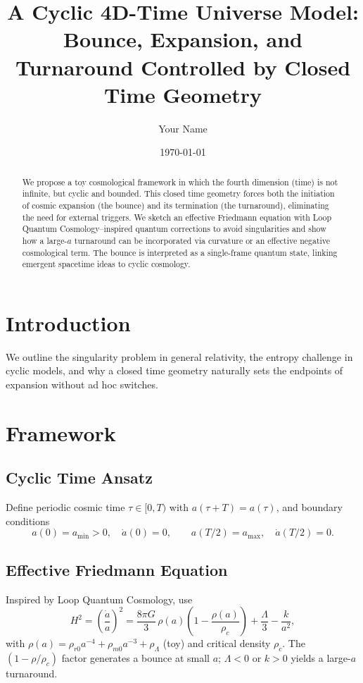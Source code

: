 \documentclass[12pt]{article}
\title{A Cyclic 4D-Time Universe Model: Bounce, Expansion, and Turnaround Controlled by Closed Time Geometry}
\author{Your Name}
\date{\today}
\begin{document}
\maketitle

\begin{abstract}
We propose a toy cosmological framework in which the fourth dimension (time) is not infinite,
but cyclic and bounded. This closed time geometry forces both the initiation of cosmic expansion
(the bounce) and its termination (the turnaround), eliminating the need for external triggers.
We sketch an effective Friedmann equation with Loop Quantum Cosmology--inspired quantum corrections
to avoid singularities and show how a large-$a$ turnaround can be incorporated via curvature or an
effective negative cosmological term. The bounce is interpreted as a single-frame quantum state,
linking emergent spacetime ideas to cyclic cosmology.
\end{abstract}

\section{Introduction}
We outline the singularity problem in general relativity, the entropy challenge in cyclic models,
and why a closed time geometry naturally sets the endpoints of expansion without ad hoc switches.

\section{Framework}
\subsection{Cyclic Time Ansatz}
Define periodic cosmic time $\tau\in[0,T)$ with $a(\tau+T)=a(\tau)$, and boundary conditions
\begin{equation}
a(0)=a_{\min}>0,\quad \dot a(0)=0,\qquad a(T/2)=a_{\max},\quad \dot a(T/2)=0.
\end{equation}

\subsection{Effective Friedmann Equation}
Inspired by Loop Quantum Cosmology, use
\begin{equation}
H^2=\left(\frac{\dot a}{a}\right)^2=\frac{8\pi G}{3}\,\rho(a)\left(1-\frac{\rho(a)}{\rho_c}\right)
+\frac{\Lambda}{3}-\frac{k}{a^2},
\end{equation}
with $\rho(a)=\rho_{r0}a^{-4}+\rho_{m0}a^{-3}+\rho_\Lambda$ (toy) and critical density $\rho_c$.
The $(1-\rho/\rho_c)$ factor generates a bounce at small $a$; $\Lambda<0$ or $k>0$ yields a
large-$a$ turnaround.
\end{document}
